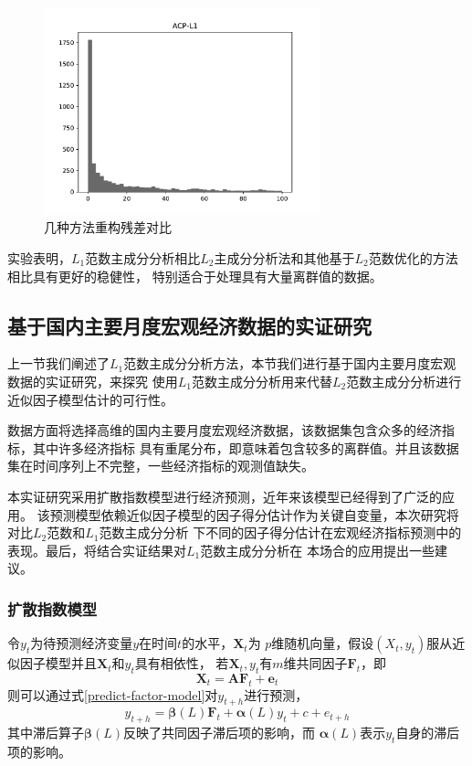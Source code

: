 \begin{figure}[H]
\begin{minipage}[t]{0.48\textwidth}
    \end{minipage}
    \begin{minipage}[t]{0.48\textwidth}
    \includegraphics[width=8cm]{pics/lab1/acp-l1.pdf}
    \end{minipage}
    \caption{\small 几种方法重构残差对比}
\end{figure}

实验表明，$L_1$范数主成分分析相比$L_2$主成分分析法和其他基于$L_2$范数优化的方法相比具有更好的稳健性，
特别适合于处理具有大量离群值的数据。

\subsection{基于国内主要月度宏观经济数据的实证研究}
上一节我们阐述了$L_1$范数主成分分析方法，本节我们进行基于国内主要月度宏观数据的实证研究，来探究
使用$L_1$范数主成分分析用来代替$L_2$范数主成分分析进行近似因子模型估计的可行性。

数据方面将选择高维的国内主要月度宏观经济数据，该数据集包含众多的经济指标，其中许多经济指标
具有重尾分布，即意味着包含较多的离群值。并且该数据集在时间序列上不完整，一些经济指标的观测值缺失。

本实证研究采用扩散指数模型进行经济预测\cite{stock2002macroeconomic}，近年来该模型已经得到了广泛的应用。
该预测模型依赖近似因子模型的因子得分估计作为关键自变量，本次研究将对比$L_2$范数和$L_1$范数主成分分析
下不同的因子得分估计在宏观经济指标预测中的表现。最后，将结合实证结果对$L_1$范数主成分分析在
本场合的应用提出一些建议。

\subsubsection{扩散指数模型}
令$y_t$为待预测经济变量$y$在时间$t$的水平，$\bm{X}_t$为
$p$维随机向量，假设$(X_t,y_t)$服从近似因子模型并且$\bm{X}_t$和$y_t$具有相依性，
若$\bm{X}_t, y_t$有$m$维共同因子$\bm{F}_t$，即
\begin{equation}
    \bm{X}_t = \bm{A}\bm{F}_t + \bm{e}_t
\end{equation}
则可以通过式\eqref{predict-factor-model}对$y_{t+h}$进行预测，
\begin{equation}\label{predict-factor-model}
    y_{t+h} = \bm{\beta}(L)\bm{F}_t + \bm{\alpha}(L)y_t + c + e_{t+h}
\end{equation}
其中滞后算子$\bm{\beta}(L)$反映了共同因子滞后项的影响，而
$\bm{\alpha}(L)$表示$y_t$自身的滞后项的影响。

